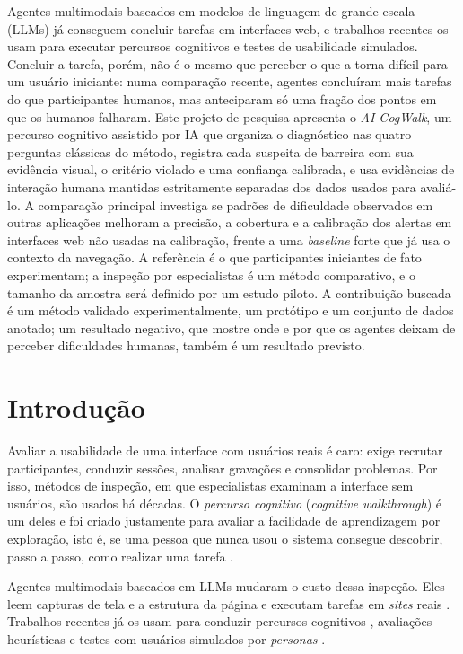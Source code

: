 \documentclass[12pt]{article}
\newcommand{\proj}{AI-CogWalk}
\begin{document}
\begin{resumo}
Agentes multimodais baseados em modelos de linguagem de grande escala (LLMs) já conseguem concluir tarefas em interfaces web, e trabalhos recentes os usam para executar percursos cognitivos e testes de usabilidade simulados. Concluir a tarefa, porém, não é o mesmo que perceber o que a torna difícil para um usuário iniciante: numa comparação recente, agentes concluíram mais tarefas do que participantes humanos, mas anteciparam só uma fração dos pontos em que os humanos falharam. Este projeto de pesquisa apresenta o \textit{\proj}, um percurso cognitivo assistido por IA que organiza o diagnóstico nas quatro perguntas clássicas do método, registra cada suspeita de barreira com sua evidência visual, o critério violado e uma confiança calibrada, e usa evidências de interação humana mantidas estritamente separadas dos dados usados para avaliá-lo. A comparação principal investiga se padrões de dificuldade observados em outras aplicações melhoram a precisão, a cobertura e a calibração dos alertas em interfaces web não usadas na calibração, frente a uma \textit{baseline} forte que já usa o contexto da navegação. A referência é o que participantes iniciantes de fato experimentam; a inspeção por especialistas é um método comparativo, e o tamanho da amostra será definido por um estudo piloto. A contribuição buscada é um método validado experimentalmente, um protótipo e um conjunto de dados anotado; um resultado negativo, que mostre onde e por que os agentes deixam de perceber dificuldades humanas, também é um resultado previsto.
\end{resumo}

\section{Introdução}
\label{sec:intro}

Avaliar a usabilidade de uma interface com usuários reais é caro: exige recrutar participantes, conduzir sessões, analisar gravações e consolidar problemas. Por isso, métodos de inspeção, em que especialistas examinam a interface sem usuários, são usados há décadas. O \textit{percurso cognitivo} (\textit{cognitive walkthrough}) é um deles e foi criado justamente para avaliar a facilidade de aprendizagem por exploração, isto é, se uma pessoa que nunca usou o sistema consegue descobrir, passo a passo, como realizar uma tarefa \cite{polson1992cw,wharton1994cw}.

Agentes multimodais baseados em LLMs mudaram o custo dessa inspeção. Eles leem capturas de tela e a estrutura da página e executam tarefas em \textit{sites} reais \cite{deng2023mind2web,zhou2024webarena}. Trabalhos recentes já os usam para conduzir percursos cognitivos \cite{bisante2024cwgpt,zhong2025syntheticcw}, avaliações heurísticas \cite{zhong2025syntheticheuristic,guerino2025gpt4o,duan2024mockups} e testes com usuários simulados por \textit{personas} \cite{lu2025uxagent,tan2026avenirux,holter2026uxcascade,bougie2026perceptui}.
\end{document}
